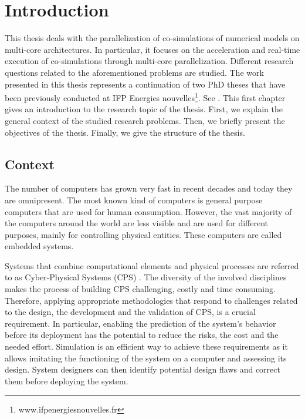 
\chapter{\label{ch:1-intro}Introduction} 

\minitoc

This thesis deals with the parallelization of co-simulations of numerical models on multi-core architectures. In particular, it focuses on the acceleration and real-time execution of co-simulations through multi-core parallelization. Different research questions related to the aforementioned problems are studied. The work presented in this thesis represents a continuation of two PhD theses that have been previously conducted at IFP Energies nouvelles\footnote{www.ifpenergiesnouvelles.fr}. See \cite{faure:2011,benkhaled:2014_thesis}. This first chapter gives an introduction to the research topic of the thesis. First, we explain the general context of the studied research problems. Then, we briefly present the objectives of the thesis. Finally, we give the structure of the thesis. 

\section{Context}

The number of computers has grown very fast in recent decades and today they are omnipresent. The most known kind of computers is general purpose computers that are used for human consumption. However, the vast majority of the computers around the world are less visible and are used for different purposes, mainly for controlling physical entities. These computers are called embedded systems. 

Systems that combine computational elements and physical processes are referred to as Cyber-Physical Systems (CPS) \cite{lee:2016}. The diversity of the involved disciplines makes the process of building CPS challenging, costly and time consuming. Therefore, applying appropriate methodologies that respond to challenges related to the design, the development and the validation of CPS, is a crucial requirement. In particular, enabling the prediction of the system's behavior before its deployment has the potential to reduce the risks, the cost and the needed effort. Simulation is an efficient way to achieve these requirements as it allows imitating the functioning of the system on a computer and assessing its design. System designers can then identify potential design flaws and correct them before deploying the system.

